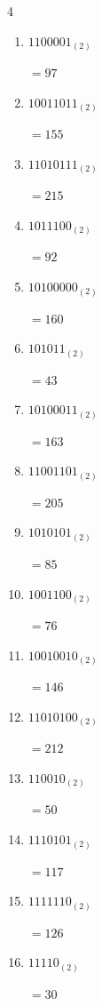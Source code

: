 \begin{multicols}{4}
\begin{enumerate}
  \item $1100001_{(2)}$

        $=97$

  \item $10011011_{(2)}$

        $=155$

  \item $11010111_{(2)}$

        $=215$

  \item $1011100_{(2)}$

        $=92$

  \item $10100000_{(2)}$

        $=160$

  \item $101011_{(2)}$

        $=43$

  \item $10100011_{(2)}$

        $=163$

  \item $11001101_{(2)}$

        $=205$

  \item $1010101_{(2)}$

        $=85$

  \item $1001100_{(2)}$

        $=76$

  \item $10010010_{(2)}$

        $=146$

  \item $11010100_{(2)}$

        $=212$

  \item $110010_{(2)}$

        $=50$

  \item $1110101_{(2)}$

        $=117$

\columnbreak %

  \item $1111110_{(2)}$

        $=126$

  \item $11110_{(2)}$

        $=30$


\end{enumerate}
\end{multicols}
